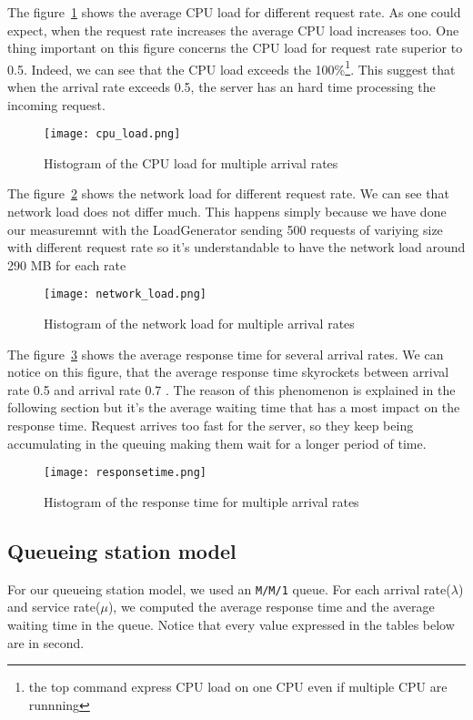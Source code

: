 The figure~\ref{fig:histocpu} shows the average CPU load for different request rate. As one could
expect, when the request rate increases the average CPU load increases too. One thing important
on this figure concerns the CPU load for request rate superior to 0.5. Indeed, we can see that the
CPU load exceeds the 100\%\footnote{the top command express CPU load on one CPU even if multiple
CPU are runnning}. This suggest that when the arrival rate exceeds 0.5, the server has an hard time
processing the incoming request.

\begin{figure}[!ht]
    \centering
    \texttt{[image: cpu\_load.png]}
    \caption{Histogram of the CPU load for multiple arrival rates}
    \label{fig:histocpu}
\end{figure}
The figure~\ref{fig:histonetwork} shows the network load for different request rate. We can see that
network load does not differ much. This happens simply because we have done our measuremnt with the
LoadGenerator sending 500 requests of variying size with different request rate so it's understandable to have the network load around 290 MB for each rate
\begin{figure}[!ht]
    \centering
    \texttt{[image: network\_load.png]}
    \caption{Histogram of the network load for multiple arrival rates}
    \label{fig:histonetwork}
\end{figure}

The figure~\ref{fig:historesponse} shows the average response time for several arrival rates.
We can notice on this figure, that the average response time skyrockets between arrival rate
0.5 and arrival rate 0.7 . The reason of this phenomenon is explained in the following section but
it's the average waiting time that has a most impact on the response time. Request arrives too fast
for the server, so they keep being accumulating in the queuing making them wait for a longer period
of time.
\begin{figure}[!ht]
    \centering
    \texttt{[image: responsetime.png]}
    \caption{Histogram of the response time for multiple arrival rates}
    \label{fig:historesponse}
\end{figure}

\subsection{Queueing station model}
\label{sub:Queueing station model}
For our queueing station model, we used an \texttt{M/M/1} queue. For each
arrival rate($\lambda$) and service rate($\mu$), we computed the
average response time and the average waiting time in the queue. Notice that
every value expressed in the tables below are in second.


